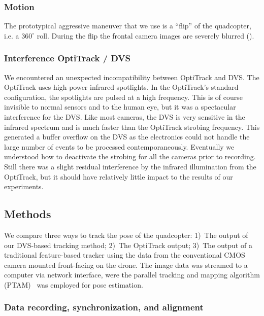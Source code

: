 \subsubsection{Motion}

The prototypical aggressive maneuver that we use is a ``flip'' of
the quadcopter, i.e. a $360^{\circ}$ roll. During the flip the frontal
camera images are severely blurred (). 




\subsubsection{Interference OptiTrack / DVS}

We encountered an unexpected incompatibility between OptiTrack and
DVS. The OptiTrack uses high-power infrared spotlights. In the OptiTrack's
standard configuration, the spotlights are pulsed at a high frequency.
This is of course invisible to normal sensors and to the human eye,
but it was a spectacular interference for the DVS. Like most cameras,
the DVS is very sensitive in the infrared spectrum and is much faster
than the OptiTrack strobing frequency. This generated a buffer overflow
on the DVS as the electronics could not handle the large number of
events to be processed contemporaneously. Eventually we understood
how to deactivate the strobing for all the cameras prior to recording.
Still there was a slight residual interference by the infrared illumination
from the OptiTrack, but it should have relatively little impact to
the results of our experiments.


\subsection{Methods}

We compare three ways to track the pose of the quadcopter: 1)~The
output of our DVS-based \ALM tracking method; 2)~The OptiTrack output;
3)~The output of a traditional feature-based tracker using the data
from the conventional CMOS camera mounted front-facing on the drone.
The image data was streamed to a computer via network interface, were
the parallel tracking and mapping algorithm (PTAM)~\cite{PTAM} was
employed for pose estimation.


\subsubsection{Data recording, synchronization, and alignment\label{sec:datarecording}}

